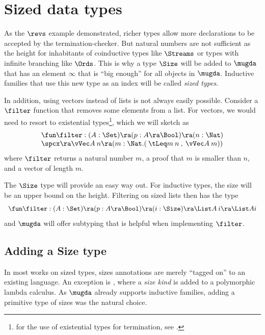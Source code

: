 \chapter{Sized data types}

As the $\revs$ example demonstrated, richer types allow more declarations to be accepted by the termination-checker. 
But natural numbers are not sufficient as the height for inhabitants of coinductive types like $\Streams$ or types with infinite branching like $\Ords$.
This is why a type $\Size$ will be added to $\mugda$ that has an element $\infty$ that is ``big enough'' for all objects in $\mugda$.
Inductive families that use this new type as an index will be called \emph{sized types}. 

In addition, using vectors instead of lists is not always easily possible.
Consider a $\filter$ function that removes some elements from a list.
For vectors, we would need to resort to existential types\footnote{for the use of existential types for termination, see \cite{xi99dependent}.}, which we will sketch as
\[ \begin{array}{l} 
\fun \filter : (A : \Set ) \ra (p : A \ra \Bool ) \ra (n : \Nat ) \\
\spcx \ra \vVec A \: n \ra (m : \Nat . (\: \tLeq m \: n \:, \: \vVec A \: m))
\end{array}\]   
where  $\filter$ returns a natural number $m$, a proof that $m$ is smaller than $n$, and a vector of length $m$.

The $\Size$ type will provide an easy way out. For inductive types, the size will be an upper bound 
on the height. Filtering on sized lists then has the type 
\[
\begin{array}{l} 
\fun \filter : (A : \Set ) \ra (p : A \ra \Bool ) \ra (i : \Size ) \ra \List A \: i \ra \List A i 
\end{array}   
\]
and $\mugda$ will offer subtyping that is helpful when implementing $\filter$.

\section{Adding a Size type}

In most works on sized types, sizes annotations are merely ``tagged on'' to an existing language. An exception is \cite{abel:PhD}, where a \emph{size kind} is added to a polymorphic lambda calculus. 
As $\mugda$ already supports inductive families, adding a primitive type of sizes was the natural choice. 

